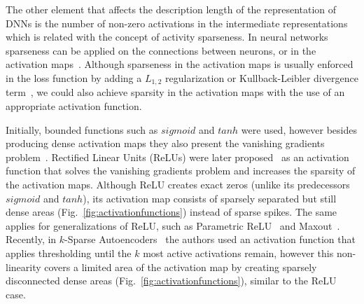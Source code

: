 \documentclass[journal]{IEEEtran}
\begin{document}
The other element that affects the description length of the representation of DNNs is the number of non-zero activations in the intermediate representations which is related with the concept of activity sparseness.
In neural networks sparseness can be applied on the connections between neurons, or in the activation maps~\cite{laughlin2003communication}.
Although sparseness in the activation maps is usually enforced in the loss function by adding a $L_{1, 2}$ regularization or Kullback-Leibler divergence term~\cite{kingma2013auto}, we could also achieve sparsity in the activation maps with the use of an appropriate activation function.

Initially, bounded functions such as $sigmoid$ and $tanh$ were used, however besides producing dense activation maps they also present the vanishing gradients problem~\cite{bengio1994learning}.
Rectified Linear Units (ReLUs) were later proposed~\cite{glorot2011deep, nair2010rectified} as an activation function that solves the vanishing gradients problem and increases the sparsity of the activation maps.
Although ReLU creates exact zeros (unlike its predecessors $sigmoid$ and $tanh$), its activation map consists of sparsely separated but still dense areas (Fig.~\ref{fig:activationfunctions}) instead of sparse spikes.
The same applies for generalizations of ReLU, such as Parametric ReLU~\cite{he2015delving} and Maxout~\cite{goodfellow2013maxout}.
Recently, in $k$-Sparse Autoencoders~\cite{makhzani2013k} the authors used an activation function that applies thresholding until the $k$ most active activations remain, however this non-linearity covers a limited area of the activation map by creating sparsely disconnected dense areas (Fig.~\ref{fig:activationfunctions}), similar to the ReLU case.
\end{document}
